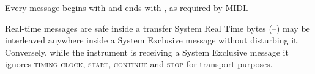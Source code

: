 Every message begins with  and ends with , as required by MIDI.

\begin{note}{Real-time messages are safe inside a transfer}
System Real Time bytes (--) may be interleaved anywhere inside a
System Exclusive message without disturbing it. Conversely, while the instrument is
receiving a System Exclusive message it ignores  \textsc{timing clock},
 \textsc{start},  \textsc{continue} and  \textsc{stop} for
transport purposes.
\end{note}
